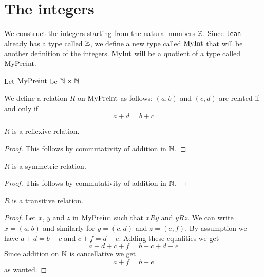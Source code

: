 \chapter{The integers}

We construct the integers starting from the natural numbers $\mathbb{Z}$. Since \texttt{lean} already has a
type called $\mathbb{Z}$, we define a new type called $\mathrm{MyInt}$ that will be another definition of the integers.
$\mathrm{MyInt}$ will be a quotient of a type called $\mathrm{MyPreint}$.

\begin{definition}
    \label{def:MyPreint}
    \leanok
    Let $\mathrm{MyPreint}$ be $\mathbb{N} \times \mathbb{N}$
\end{definition}

\begin{definition}
    \label{def:R}
    \leanok
We define a relation $R$ on $\mathrm{MyPreint}$ as follows: $(a,b)$ and $(c, d)$ are related if and only if
\[
a + d = b + c
\]
\end{definition}

\begin{lemma}
$R$ is a reflexive relation.
    \label{lemma:reflexive}
    \leanok
\end{lemma}
\begin{proof}
    \leanok
    This follows by commutativity of addition in $\mathbb{N}$.
\end{proof}

\begin{lemma}
$R$ is a symmetric relation.
    \label{lemma:symmetric}
    \leanok
\end{lemma}
\begin{proof}
    \leanok
    This follows by commutativity of addition in $\mathbb{N}$.
\end{proof}

\begin{lemma}
$R$ is a transitive relation.
    \label{lemma:transitive}
    \leanok
\end{lemma}
\begin{proof}
    \leanok
    Let $x$, $y$ and $z$ in $\mathrm{MyPreint}$ such that $x R y$ and $y R z$. We can write $x = (a,b)$ and similarly
    for $y = (c,d)$ and $z = (e,f)$. By assumption we have $a+d=b+c$ and $c+f=d+e$. Adding these equalities we get
    \[
    a+d+c+f=b+c+d+e
    \]
    Since addition on $\mathbb{N}$ is cancellative we get
    \[
    a+f = b + e
    \]
    as wanted.
\end{proof}